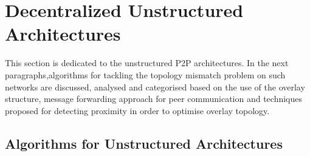 \section{Decentralized Unstructured Architectures}
\label{section:unstructured}

This section is dedicated to the unstructured P2P architectures. In the next
paragraphs,algorithms for tackling the topology mismatch problem on such
networks are discussed, analysed and categorised based on the use of the
overlay structure, message forwarding approach for peer communication and
techniques proposed for detecting proximity in order to optimise overlay
topology.


%
%
%


\subsection{Algorithms for Unstructured Architectures}




